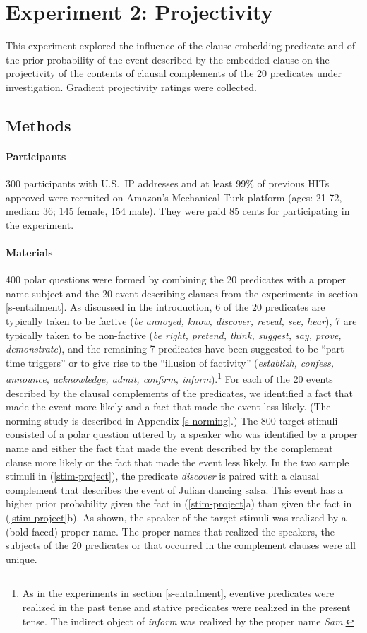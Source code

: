 \documentclass[11pt,fleqn]{article}
\newcommand{\6}{\mbox{$[\hspace*{-.6mm}[$}}
\newcommand{\9}{\mbox{$]\hspace*{-.6mm}]$}}
\begin{document}
\section{Experiment 2: Projectivity}

This experiment explored the influence of the clause-embedding predicate and of the prior probability of the event described by the embedded clause on the projectivity of the contents of clausal complements of the 20 predicates under investigation. Gradient projectivity ratings were collected.

\subsection{Methods}

\paragraph{Participants} 300 participants with U.S.\ IP addresses and at least 99\% of previous HITs approved were recruited on Amazon's Mechanical Turk platform (ages: 21-72, median: 36; 145 female, 154 male). They were paid 85 cents for participating in the experiment.

\paragraph{Materials} 400 polar questions were formed by combining the 20 predicates with a proper name subject and the 20 event-describing clauses from the experiments in section \ref{s-entailment}. As discussed in the introduction, 6 of the 20 predicates are typically taken to be factive ({\em be annoyed, know, discover, reveal, see, hear}), 7 are typically taken to be non-factive ({\em be right, pretend, think, suggest, say, prove, demonstrate}), and the remaining 7 predicates have been suggested to be ``part-time triggers'' or to give rise to the ``illusion of factivity'' ({\em establish,  confess, announce, acknowledge, admit, confirm, inform}).\footnote{As in the experiments in section \ref{s-entailment}, eventive predicates were realized in the past tense and stative predicates were realized in the present tense. The indirect object of {\em inform} was realized by the proper name {\em Sam}.} For each of the 20 events described by the clausal complements of the predicates, we identified a fact that made the event more likely and a fact that made the event less likely. (The norming study is described in Appendix \ref{s-norming}.) The 800 target stimuli consisted of a polar question uttered by a speaker who was identified by a proper name and either the fact that made the event described by the complement clause more likely or the fact that made the event less likely. In the two sample stimuli in (\ref{stim-project}), the predicate {\em discover} is paired with a clausal complement that describes the event of Julian dancing salsa. This event has a higher prior probability given the fact in (\ref{stim-project}a) than given the fact in (\ref{stim-project}b). As shown, the speaker of the target stimuli was realized by a (bold-faced) proper name. The proper names that realized the speakers, the subjects of the 20 predicates or that occurred in the complement clauses were all unique. 
\end{document}
